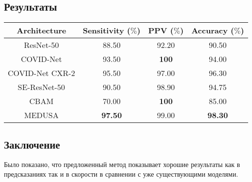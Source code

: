 \subsection*{Результаты}

{\small

\begin{center}
    \begin{tabular}{|c|c|c|c|}
    \hline
         \textbf{Architecture} & \textbf{Sensitivity ($\%$)} & \textbf{PPV ($\%$)} & \textbf{Accuracy ($\%$)} \\
    \hline
    ResNet-50 & 88.50 & 92.20 & 90.50\\
    \hline
     COVID-Net& 93.50 & \textbf{100} & 94.00 \\
    \hline
     COVID-Net CXR-2 & 95.50 & 97.00 &  96.30 \\
    \hline
    SE-ResNet-50  & 90.50 & 98.90 & 94.75\\
    \hline
    CBAM  & 70.00 & \textbf{100} & 85.00\\
    \hline
    MEDUSA & \textbf{97.50} & 99.00 & \textbf{98.30}\\
    \hline
    \end{tabular}\par

\end{center}

}

\subsection*{Заключение}
Было показано, что предложенный метод показывает хорошие результаты как в предсказаниях так и в скорости в сравнении с 
уже существующими моделями.